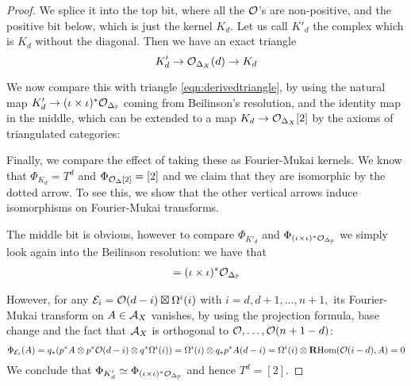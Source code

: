 \begin{proof}
    We splice it into the top bit, where all the $\mathcal{O}$'s are non-positive, and the positive bit below, which is just the kernel $K_d$. Let us call $K'_d$ the complex which is $K_d$ without the diagonal. Then we have an exact triangle $$K'_d \rightarrow \mathcal{O}_{\Delta_X}(d)\rightarrow K_d$$

    We now compare this with triangle \ref{eqn:derivedtriangle}, by using the natural map $K'_d \rightarrow (\iota\times \iota)^*\mathcal{O}_{\Delta_{\mathbb{P}}}$ coming from Beilinson's resolution, and the identity map in the middle, which can be extended to a map $K_d \rightarrow \mathcal{O}_{\Delta_X}[2]$ by the axioms of triangulated categories: 

    \begin{center}\end{center}

    Finally, we compare the effect of taking these as Fourier-Mukai kernels. We know that $\Phi_{K_d}=T^d$ and $\Phi_{\mathcal{O}_\Delta [2]}=[2]$ and we claim that they are isomorphic by the dotted arrow. To see this, we show that the other vertical arrows induce isomorphisms on Fourier-Mukai transforms.

    The middle bit is obvious, however to compare $\Phi_{K'_d}$ and $\Phi_{(\iota\times \iota)^*\mathcal{O}_{\Delta_{\mathbb{P}}}}$ we simply look again into the Beilinson resolution: we have that \begin{gather*}
        [ \O (d-n-1)\boxtimes \Omega^{n+1}(n+1)\rightarrow \dots \rightarrow \O \boxtimes \Omega^{d}(d)\rightarrow K'_d]=(\iota\times \iota)^*\O_{\Delta_\P}
    \end{gather*}

    However, for any $\mathcal{E}_i=\mathcal{O}(d-i)\boxtimes \Omega^i(i)$ with $i=d,d+1,\dots,n+1,$ its Fourier-Mukai transform on $A\in \mathcal{A}_X$ vanishes, by using the projection formula, base change and the fact that $\mathcal{A}_X$ is orthogonal to $\mathcal{O},\dots, \mathcal{O}(n+1-d)$:$$\Phi_{\mathcal{E}_i}(A)=q_*(p^*A\otimes p^* \mathcal{O}(d-i)\otimes q^* \Omega^i(i))=\Omega^i(i)\otimes q_*p^* A(d-i)=\Omega^i(i) \otimes \operatorname{\mathbf{R} Hom}(\mathcal{O}(i-d),A)=0$$ We conclude that $\Phi_{K'_d}\simeq \Phi_{(\iota\times \iota)^*\mathcal{O}_{\Delta_{\mathbb{P}}}}$ and hence $T^d=[2]$.
\end{proof}


